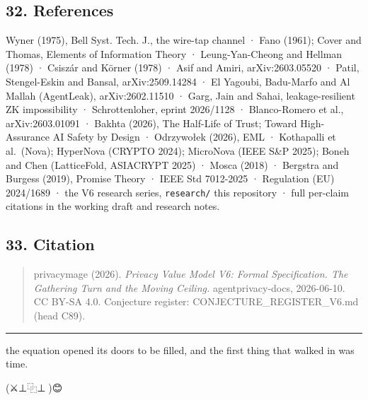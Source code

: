 \documentclass[
  11pt,
]{article}
\begin{document}
\subsection{32. References}\label{references}

Wyner (1975), Bell Syst. Tech. J., the wire-tap channel · Fano (1961);
Cover and Thomas, Elements of Information Theory · Leung-Yan-Cheong and
Hellman (1978) · Csiszár and Körner (1978) · Asif and Amiri,
arXiv:2603.05520 · Patil, Stengel-Eskin and Bansal, arXiv:2509.14284 ·
El Yagoubi, Badu-Marfo and Al Mallah (AgentLeak), arXiv:2602.11510 ·
Garg, Jain and Sahai, leakage-resilient ZK impossibility ·
Schrottenloher, eprint 2026/1128 · Blanco-Romero et al.,
arXiv:2603.01091 · Bakhta (2026), The Half-Life of Trust; Toward
High-Assurance AI Safety by Design · Odrzywołek (2026), EML · Kothapalli
et al.~(Nova); HyperNova (CRYPTO 2024); MicroNova (IEEE S\&P 2025);
Boneh and Chen (LatticeFold, ASIACRYPT 2025) · Mosca (2018) · Bergstra
and Burgess (2019), Promise Theory · IEEE Std 7012-2025 · Regulation
(EU) 2024/1689 · the V6 research series, \texttt{research/} this
repository · full per-claim citations in the working draft and research
notes.

\subsection{33. Citation}\label{citation}

\begin{quote}
privacymage (2026). \emph{Privacy Value Model V6: Formal Specification.
The Gathering Turn and the Moving Ceiling.} agentprivacy-docs,
2026-06-10. CC BY-SA 4.0. Conjecture register:
CONJECTURE\_REGISTER\_V6.md (head C89).
\end{quote}

\begin{center}\rule{0.5\linewidth}{0.5pt}\end{center}

the equation opened its doors to be filled, and the first thing that
walked in was time.

(⚔️⊥⿻⊥🧙)😊
\end{document}
